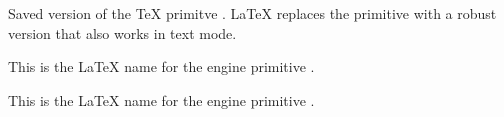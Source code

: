 \begin{function}[]
  {
    \@@startpbox
  }
  \begin{syntax}
  \end{syntax}

\end{function}



\begin{function}[]
  {
    \@@text@case@aux
  }
  \begin{syntax}
  \end{syntax}

\end{function}



\begin{function}[int]
  {
    \@@underline
  }
  \begin{syntax}
  \end{syntax}

  Saved version of the \TeX{} primitve . \LaTeX{}
  replaces the primitive with a robust version that also works in text
  mode.

  This is the \LaTeX{} name for the engine primitive .
\end{function}



\begin{function}[]
  {
    \@@unprocessedoptions
  }
  \begin{syntax}
  \end{syntax}

\end{function}



\begin{function}[]
  {
    \@@write
  }
  \begin{syntax}
  \end{syntax}
  This is the \LaTeX{} name for the engine primitive .
\end{function}



\begin{function}[]
  {
    \@DeclareMathDelimiter
  }
  \begin{syntax}
  \end{syntax}

\end{function}



